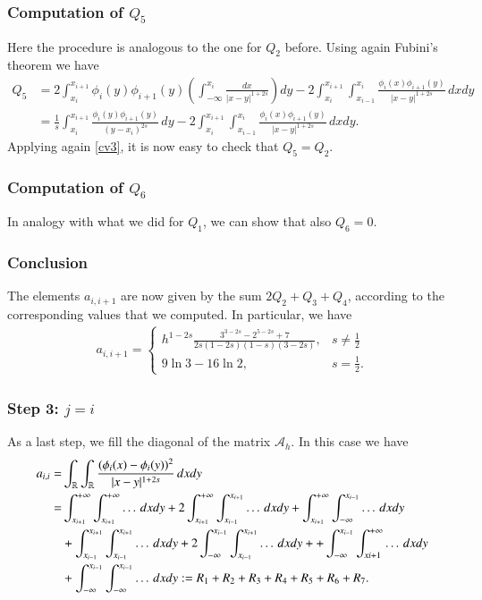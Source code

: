 {\subsubsection*{Computation of $Q_5$}
Here the procedure is analogous to the one for $Q_2$ before. Using again Fubini's theorem we have
\begin{align*}
	Q_5 &= 2\int_{x_i}^{x_{i+1}}\phi_i(y)\phi_{i+1}(y)\left(\int_{-\infty}^{x_i} \frac{dx}{|x-y|^{1+2s}}\right)dy - 2\int_{x_i}^{x_{i+1}}\int_{x_{i-1}}^{x_i} \frac{\phi_i(x)\phi_{i+1}(y)}{|x-y|^{1+2s}}\,dxdy 
	\\
	&= \frac{1}{s}\int_{x_i}^{x_{i+1}}\frac{\phi_i(y)\phi_{i+1}(y)}{(y-x_i)^{2s}}\,dy - 2\int_{x_i}^{x_{i+1}}\int_{x_{i-1}}^{x_i} \frac{\phi_i(x)\phi_{i+1}(y)}{|x-y|^{1+2s}}\,dxdy. 
\end{align*}
Applying again \ref{cv3}, it is now easy to check that $Q_5=Q_2$.

\subsubsection*{Computation of $Q_6$}
In analogy with what we did for $Q_1$, we can show that also $Q_6=0$.

\subsubsection*{Conclusion}
The elements $a_{i,i+1}$ are now given by the sum $2Q_2+Q_3+Q_4$, according to the corresponding values that we computed. In particular, we have
\begin{align}\label{Aii1}
	a_{i,i+1} = \begin{cases}
					\displaystyle h^{1-2s}\frac{3^{3-2s}-2^{5-2s}+7}{2s(1-2s)(1-s)(3-2s)}, & \displaystyle s\neq \frac{1}{2}
					\\
					9\ln 3-16\ln 2, & \displaystyle s=\frac{1}{2}.
				\end{cases}	
\end{align}

\subsubsection*{Step 3: $j= i$}
As a last step, we fill the diagonal of the matrix $\mathcal A_h$. In this case we have
	\begin{align*}
	a_{i,i}= & \int_{\mathbb{R}}\int_{\mathbb{R}}\frac{(\phi_i(x)-\phi_i(y))^2}{|x-y|^{1+2s}}\,dxdy
	\\
	= & \int_{x_{i+1}}^{+\infty}\int_{x_{i+1}}^{+\infty} \ldots\,dxdy + 2\int_{x_{i+1}}^{+\infty}\int_{x_{i-1}}^{x_{i+1}} \ldots\,dxdy + \int_{x_{i+1}}^{+\infty}\int_{-\infty}^{x_{i-1}} \ldots\,dxdy 
	\\
	& + \int_{x_{i-1}}^{x_{i+1}}\int_{x_{i-1}}^{x_{i+1}} \ldots\,dxdy + 2\int_{-\infty}^{x_{i-1}}\int_{x_{i-1}}^{x_{i+1}} \ldots\,dxdy + + \int_{-\infty}^{x_{i-1}}\int_{x{i+1}}^{+\infty} \ldots\,dxdy 
	\\
	& +  \int_{-\infty}^{x_{i-1}}\int_{-\infty}^{x_{i-1}} \ldots\,dxdy := R_1 + R_2 + R_3 + R_4 + R_5 + R_6 + R_7.
\end{align*}

}
